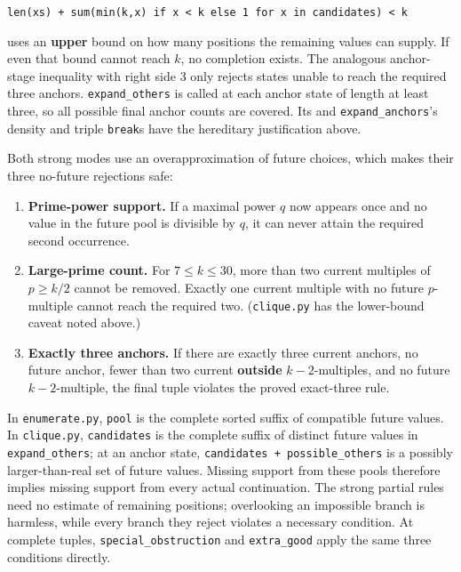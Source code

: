 \documentclass[11pt,a4paper]{article}
\providecommand{\tightlist}{\setlength{\itemsep}{0pt}\setlength{\parskip}{0pt}}
\begin{document}
\texttt{len(xs)\ +\ sum(min(k,x)\ if\ x\ \textless{}\ k\ else\ 1\ for\ x\ in\ candidates)\ \textless{}\ k}

uses an \textbf{upper} bound on how many positions the remaining values can supply. If even that bound cannot reach \(k\), no completion exists. The analogous anchor-stage inequality with right side 3 only rejects states unable to reach the required three anchors. \texttt{expand\_others} is called at each anchor state of length at least three, so all possible final anchor counts are covered. Its and \texttt{expand\_anchors}'s density and triple \texttt{break}s have the hereditary justification above.

Both strong modes use an overapproximation of future choices, which makes their three no-future rejections safe:

\begin{enumerate}
\def\labelenumi{\arabic{enumi}.}
\tightlist
\item
  \textbf{Prime-power support.} If a maximal power \(q\) now appears once and no value in the future pool is divisible by \(q\), it can never attain the required second occurrence.
\item
  \textbf{Large-prime count.} For \(7\le k\le30\), more than two current multiples of \(p\ge k/2\) cannot be removed. Exactly one current multiple with no future \(p\)-multiple cannot reach the required two. (\texttt{clique.py} has the lower-bound caveat noted above.)
\item
  \textbf{Exactly three anchors.} If there are exactly three current anchors, no future anchor, fewer than two current \textbf{outside} \(k-2\)-multiples, and no future \(k-2\)-multiple, the final tuple violates the proved exact-three rule.
\end{enumerate}

In \texttt{enumerate.py}, \texttt{pool} is the complete sorted suffix of compatible future values. In \texttt{clique.py}, \texttt{candidates} is the complete suffix of distinct future values in \texttt{expand\_others}; at an anchor state, \texttt{candidates\ +\ possible\_others} is a possibly larger-than-real set of future values. Missing support from these pools therefore implies missing support from every actual continuation. The strong partial rules need no estimate of remaining positions; overlooking an impossible branch is harmless, while every branch they reject violates a necessary condition. At complete tuples, \texttt{special\_obstruction} and \texttt{extra\_good} apply the same three conditions directly.
\end{document}
